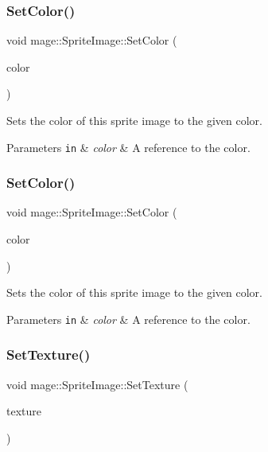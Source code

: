 \subsubsection{\texorpdfstring{Set\+Color()}{SetColor()}\hspace{0.1cm}{\footnotesize\ttfamily [1/2]}}
{\footnotesize\ttfamily void mage\+::\+Sprite\+Image\+::\+Set\+Color (\begin{DoxyParamCaption}\item[{const \hyperlink{structmage_1_1_color}{Color} \&}]{color }\end{DoxyParamCaption})}

Sets the color of this sprite image to the given color.


\begin{DoxyParams}[1]{Parameters}
\mbox{\tt in}  & {\em color} & A reference to the color. \\
\hline
\end{DoxyParams}
\hypertarget{classmage_1_1_sprite_image_a936547b1852b2249f03c3187bc354ee8}{}\label{classmage_1_1_sprite_image_a936547b1852b2249f03c3187bc354ee8} 
\subsubsection{\texorpdfstring{Set\+Color()}{SetColor()}\hspace{0.1cm}{\footnotesize\ttfamily [2/2]}}
{\footnotesize\ttfamily void mage\+::\+Sprite\+Image\+::\+Set\+Color (\begin{DoxyParamCaption}\item[{const X\+M\+V\+E\+C\+T\+OR \&}]{color }\end{DoxyParamCaption})}

Sets the color of this sprite image to the given color.


\begin{DoxyParams}[1]{Parameters}
\mbox{\tt in}  & {\em color} & A reference to the color. \\
\hline
\end{DoxyParams}
\hypertarget{classmage_1_1_sprite_image_a12e0ffecc7995f13ccf0374fa37dc4c6}{}\label{classmage_1_1_sprite_image_a12e0ffecc7995f13ccf0374fa37dc4c6} 
\subsubsection{\texorpdfstring{Set\+Texture()}{SetTexture()}}
{\footnotesize\ttfamily void mage\+::\+Sprite\+Image\+::\+Set\+Texture (\begin{DoxyParamCaption}\item[{\hyperlink{namespacemage_a1e01ae66713838a7a67d30e44c67703e}{Shared\+Ptr}$<$ \hyperlink{classmage_1_1_texture}{Texture} $>$}]{texture }\end{DoxyParamCaption})}


